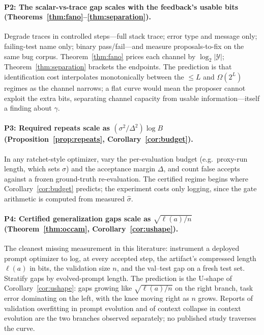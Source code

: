 \documentclass{article}
\theoremstyle{plain}
\theoremstyle{definition}
\theoremstyle{remark}
\newcommand{\Y}{\mathcal{Y}}
\newcommand{\len}{\ell}
\begin{document}
\paragraph{P2: The scalar-vs-trace gap scales with the feedback's usable bits (Theorems~\ref{thm:fano}--\ref{thm:separation}).}
Degrade traces in controlled steps---full stack trace; error type and message only; failing-test name only; binary pass/fail---and measure proposals-to-fix on the same bug corpus. Theorem~\ref{thm:fano} prices each channel by $\log_2|\Y|$; Theorem~\ref{thm:separation} brackets the endpoints. The prediction is that identification cost interpolates monotonically between the $\le L$ and $\Omega(2^L)$ regimes as the channel narrows; a flat curve would mean the proposer cannot exploit the extra bits, separating channel capacity from usable information---itself a finding about $\gamma$.

\paragraph{P3: Required repeats scale as $(\sigma^2/\Delta^2)\log B$ (Proposition~\ref{prop:repeats}, Corollary~\ref{cor:budget}).}
In any ratchet-style optimizer, vary the per-evaluation budget (e.g.\ proxy-run length, which sets $\sigma$) and the acceptance margin $\Delta$, and count false accepts against a frozen ground-truth re-evaluation. The certified regime begins where Corollary~\ref{cor:budget} predicts; the experiment costs only logging, since the gate arithmetic is computed from measured $\hat\sigma$.

\paragraph{P4: Certified generalization gaps scale as $\sqrt{\len(a)/n}$ (Theorem~\ref{thm:occam}, Corollary~\ref{cor:ushape}).}
The cleanest missing measurement in this literature: instrument a deployed prompt optimizer to log, at every accepted step, the artifact's compressed length $\len(a)$ in bits, the validation size $n$, and the val--test gap on a fresh test set. Stratify gaps by evolved-prompt length. The prediction is the U-shape of Corollary~\ref{cor:ushape}: gaps growing like $\sqrt{\len(a)/n}$ on the right branch, task error dominating on the left, with the knee moving right as $n$ grows. Reports of validation overfitting in prompt evolution and of context collapse in context evolution \citep{zhang2025ace} are the two branches observed separately; no published study traverses the curve.
\end{document}
